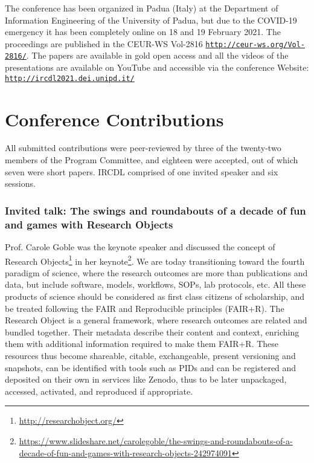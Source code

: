 \documentclass[sigconf, nonacm]{acmart}
\begin{document}
The conference has been organized in Padua (Italy) at the Department of Information Engineering of the University of Padua, but due to the COVID-19 emergency it has been completely online on 18 and 19 February 2021. The proceedings are published in the CEUR-WS  Vol-2816 \texttt{\url{http://ceur-ws.org/Vol-2816/}}. The papers are available in gold open access and all the videos of the presentations are available on YouTube and accessible via the conference Website: \texttt{\url{http://ircdl2021.dei.unipd.it/}}

\section{Conference Contributions}
All submitted contributions were peer-reviewed by three of the twenty-two members of the Program Committee, and eighteen were accepted, out of which seven were short papers. IRCDL comprised of one invited speaker and six sessions.

\subsubsection*{Invited talk: The swings and roundabouts of a decade of fun and games with Research Objects} Prof. Carole Goble was the keynote speaker and discussed the concept of Research Objects\footnote{\url{http://researchobject.org/}}\cite{bechhofer2013linked} in her keynote\footnote{\url{https://www.slideshare.net/carolegoble/the-swings-and-roundabouts-of-a-decade-of-fun-and-games-with-research-objects-242974091}}. We are today transitioning toward the fourth paradigm of science, where the research outcomes are more than publications and data, but include software, models, workflows, SOPs, lab protocols, etc. All these products of science should be considered as first class citizens of scholarship, and be treated following the FAIR and Reproducible principles (FAIR+R). 
The Research Object is a general framework, where research outcomes are related and bundled together. Their metadata describe their content and context, enriching them with additional information required to make them FAIR+R. These resources thus become shareable, citable, exchangeable, present versioning and snapshots, can be identified with tools such as PIDs and can be registered and deposited on their own in services like Zenodo, thus to be later unpackaged, accessed, activated, and reproduced if appropriate. 
\end{document}
